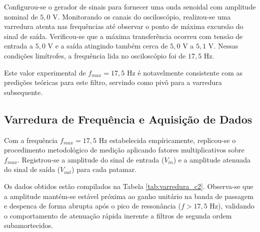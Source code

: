 Configurou-se o gerador de sinais para fornecer uma onda senoidal com amplitude nominal de $5,0\text{ V}$. Monitorando os canais do osciloscópio, realizou-se uma varredura atenta nas frequências até observar o ponto de máxima excursão do sinal de saída. Verificou-se que a máxima transferência ocorreu com tensão de entrada a $5,0\text{ V}$ e a saída atingindo também cerca de $5,0\text{ V}$ a $5,1\text{ V}$. Nessas condições limítrofes, a frequência lida no osciloscópio foi de \textbf{$17,5\text{ Hz}$}. 

Este valor experimental de $f_{max} = 17,5\text{ Hz}$ é notavelmente consistente com as predições teóricas para este filtro, servindo como pivô para a varredura subsequente.

\subsection{Varredura de Frequência e Aquisição de Dados}

Com a frequência $f_{max} = 17,5\text{ Hz}$ estabelecida empíricamente, replicou-se o procedimento metodológico de medição aplicando fatores multiplicativos sobre $f_{max}$. Registrou-se a amplitude do sinal de entrada ($V_{in}$) e a amplitude atenuada do sinal de saída ($V_{out}$) para cada patamar. 

Os dados obtidos estão compilados na Tabela \ref{tab:varredura_c2}. Observa-se que a amplitude mantém-se estável próxima ao ganho unitário na banda de passagem e despenca de forma abrupta após o pico de ressonância ($f > 17,5\text{ Hz}$), validando o comportamento de atenuação rápida inerente a filtros de segunda ordem subamortecidos.

